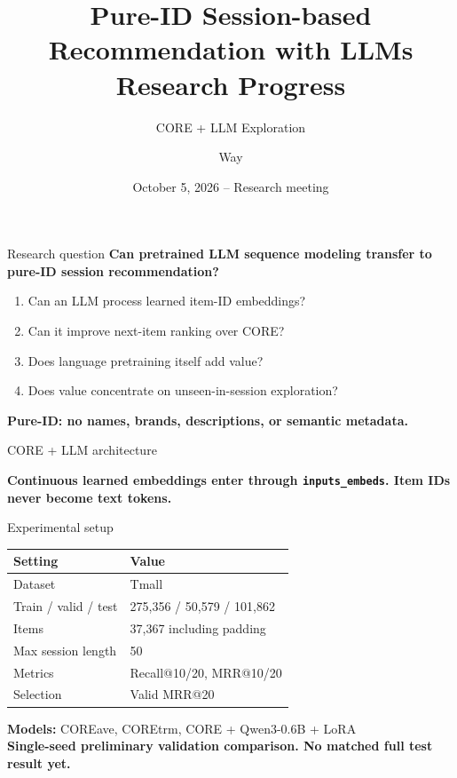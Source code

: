 \documentclass[aspectratio=169,10pt]{beamer}
\title{Pure-ID Session-based Recommendation with LLMs\\[0.35em]\Large Research Progress}
\subtitle{CORE + LLM Exploration}
\author{Way}
\date{October 5, 2026 -- Research meeting}
\newcommand{\status}[1]{\textcolor{accentdark}{\textbf{#1}}}
\begin{document}
\begin{frame}[plain]\titlepage\end{frame}

\begin{frame}{Research question}
\centering\Large\textbf{Can pretrained LLM sequence modeling transfer to pure-ID session recommendation?}
\vspace{1em}
\begin{enumerate}\normalsize
\item Can an LLM process learned item-ID embeddings?
\item Can it improve next-item ranking over CORE?
\item Does language pretraining itself add value?
\item Does value concentrate on unseen-in-session exploration?
\end{enumerate}
\vfill\status{Pure-ID: no names, brands, descriptions, or semantic metadata.}
\end{frame}

\begin{frame}{CORE + LLM architecture}
\centering
{}
\vfill\textbf{Continuous learned embeddings enter through \texttt{inputs\_embeds}. Item IDs never become text tokens.}
\end{frame}

\begin{frame}{Experimental setup}
\begin{tabular}{ll}\toprule Setting & Value\\\midrule
Dataset & Tmall\\
Train / valid / test & 275,356 / 50,579 / 101,862\\
Items & 37,367 including padding\\
Max session length & 50\\
Metrics & Recall@10/20, MRR@10/20\\
Selection & Valid MRR@20\\\bottomrule
\end{tabular}
\vspace{1em}
\textbf{Models:} COREave, COREtrm, CORE + Qwen3-0.6B + LoRA\\
\status{Single-seed preliminary validation comparison. No matched full test result yet.}
\end{frame}
\end{document}

